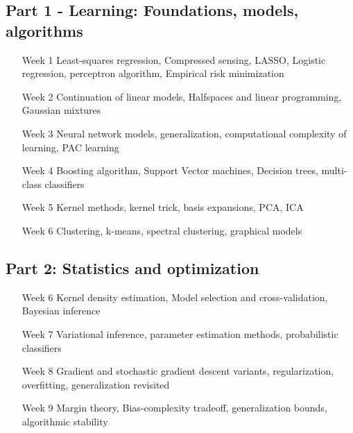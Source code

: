 \documentclass[12pt]{article}
\begin{document}
\subsection*{Part 1 - Learning: Foundations, models, algorithms}
\begin{itemize}
	\item[Week 1] Least-squares regression, Compressed sensing, LASSO, Logistic regression, perceptron algorithm, Empirical risk minimization
	\item[Week 2] Continuation of linear models, Halfspaces and linear programming, Gaussian mixtures
	\item[Week 3 ] Neural network models, generalization, computational complexity of learning, PAC learning
	\item[Week 4] Boosting algorithm, Support Vector machines, Decision trees, multi-class classifiers
	\item[Week 5] Kernel methods, kernel trick, basis expansions, PCA, ICA
	\item[Week 6] Clustering, k-means, spectral clustering, graphical models
\end{itemize}
\subsection*{Part 2: Statistics and optimization}
\begin{itemize}
	\item[Week 6] Kernel density estimation, Model selection and cross-validation, Bayesian inference
	\item[Week 7] Variational inference, parameter estimation methods, probabilistic classifiers
	\item[Week 8] Gradient and stochastic gradient descent variants, regularization, overfitting, generalization revisited

	\item[Week 9] Margin theory, Bias-complexity tradeoff, generalization bounds, algorithmic stability

	\end{itemize}
\end{document}
